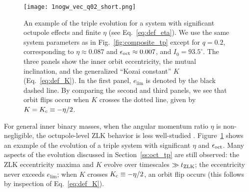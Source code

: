 \documentclass[
        fleqn,
        usenatbib,
    ]{mnras}
\newlength{\colummwidth}
\begin{document}
\begin{figure}
    \centering
    \texttt{[image: 1nogw\_vec\_q02\_short.png]}
    \caption{An example of the triple evolution for a system with significant
    octupole effects and finite $\eta$ (see Eq.~\ref{eq:def_eta}). We use the
    same system parameters as in Fig.~\ref{fig:composite_tp} except for $q =
    0.2$, corresponding to $\eta \approx 0.087$ and $\epsilon_{\rm oct} \approx
    0.007$, and $I_0 = 93.5^\circ$. The three panels show the inner orbit
    eccentricity, the mutual inclination, and the generalized ``Kozai constant''
    $K$ (Eq.~\ref{eq:def_K}). In the first panel, $e_{\lim}$ is denoted by the
    black dashed line. By comparing the second and third panels, we see that
    orbit flips occur when $K$ crosses the dotted line, given by $K = K_{\rm c}
    \equiv -\eta / 2$. }\label{fig:nogw_fiducial}
\end{figure}

For general inner binary masses, when the angular momentum ratio $\eta$ is
non-negligible, the octupole-level ZLK behavior is less well-studied
\citep[see][]{LML15}. Figure~\ref{fig:nogw_fiducial} shows an example of the
evolution of a triple system with significant $\eta$ and $\epsilon_{\rm oct}$.
Many aspects of the evolution discussed in Section~\ref{ss:oct_tp} are still
observed: the ZLK eccentricity maxima and $K$ evolve over timescales $\gg t_{\rm
ZLK}$; the eccentricity never exceeds $e_{\lim}$; when $K$ crosses $K_{\rm c}
\equiv -\eta / 2$, an orbit flip occurs (this follows by inspection of
Eq.~\ref{eq:def_K}).
\end{document}
